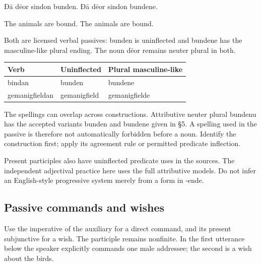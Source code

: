 Ðā dēor sindon bunden. Ðā dēor sindon bundene.

The animals are bound. The animals are bound.

Both are licensed verbal passives: bunden is uninflected and bundene has the masculine-like plural ending. The noun dēor remains neuter plural in both.

\par\begingroup
\fontsize{10.5}{13.2}\selectfont
\setlength{\LTleft}{0pt}\setlength{\LTright}{\fill}
\noindent
\begin{tabular}{@{}>{\raggedright\arraybackslash}p{38.41mm}>{\raggedright\arraybackslash}p{32.92mm}>{\raggedright\arraybackslash}p{47.05mm}@{}}
\toprule
\textbf{Verb} & \textbf{Uninflected} & \textbf{Plural masculine-like} \\
\midrule
bindan & bunden & bundene \\
gemanigfieldan & gemanigfield & gemanigfielde \\
\bottomrule
\end{tabular}
\par\endgroup

The spellings can overlap across constructions. Attributive neuter plural bundenu has the accepted variants bunden and bundene given in §5. A spelling used in the passive is therefore not automatically forbidden before a noun. Identify the construction first; apply its agreement rule or permitted predicate inflection.

Present participles also have uninflected predicate uses in the sources. The independent adjectival practice here uses the full attributive models. Do not infer an English-style progressive system merely from a form in -ende.

\subsection*{Passive commands and wishes}

Use the imperative of the auxiliary for a direct command, and its present subjunctive for a wish. The participle remains nonfinite. In the first utterance below the speaker explicitly commands one male addressee; the second is a wish about the birds.


